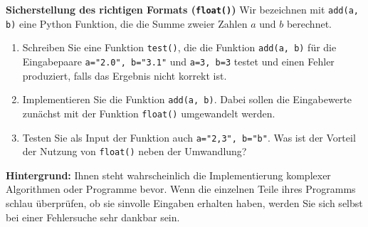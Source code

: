 \textbf{Sicherstellung des richtigen Formats (\texttt{float()})}
Wir bezeichnen mit \verb|add(a, b)| eine Python Funktion, die die Summe zweier Zahlen $a$ und $b$ berechnet.
\begin{enumerate}
	\item Schreiben Sie eine Funktion \verb|test()|, die die Funktion \verb|add(a, b)| für die Eingabepaare \verb|a="2.0", b="3.1"| und \verb|a=3, b=3| testet und einen Fehler produziert, falls das Ergebnis nicht korrekt ist.
	\item Implementieren Sie die Funktion \verb|add(a, b)|. Dabei sollen die Eingabewerte zunächst
	mit der Funktion \verb|float()|  umgewandelt werden.
	\item Testen Sie als Input der Funktion auch \verb|a="2,3", b="b"|. Was ist der Vorteil der Nutzung von \verb|float()| neben der Umwandlung?
\end{enumerate}

\textbf{Hintergrund: } Ihnen steht wahrscheinlich die Implementierung komplexer Algorithmen oder Programme bevor. Wenn die einzelnen Teile ihres Programms schlau überprüfen, ob sie sinvolle Eingaben erhalten haben, werden Sie sich selbst bei einer Fehlersuche sehr dankbar sein. \\